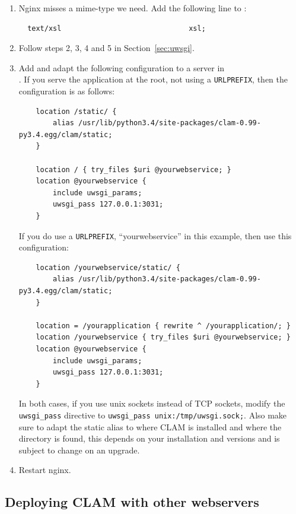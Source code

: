 \documentclass[a4paper,12pt,twoside,openright]{report}
\begin{document}
\begin{enumerate}[leftmargin=5mm]
\item Nginx misses a mime-type we need. Add the following
    line to :
{ \small
\begin{verbatim}
  text/xsl                              xsl;
\end{verbatim}
}

\item Follow steps 2, 3, 4 and 5 in Section~\ref{sec:uwsgi}.

\item Add and adapt the following configuration to a server in \\
    . If you serve the application at the
        root, not using a \texttt{URLPREFIX}, then the configuration is as
        follows:
{\small
\begin{verbatim}
    location /static/ {
        alias /usr/lib/python3.4/site-packages/clam-0.99-py3.4.egg/clam/static;
    }

    location / { try_files $uri @yourwebservice; }
    location @yourwebservice {
        include uwsgi_params;
        uwsgi_pass 127.0.0.1:3031;
    }
\end{verbatim}
}
If you do use a \texttt{URLPREFIX}, ``yourwebservice'' in this example, then
use this configuration:
{\small
\begin{verbatim}
    location /yourwebservice/static/ {
        alias /usr/lib/python3.4/site-packages/clam-0.99-py3.4.egg/clam/static;
    }

    location = /yourapplication { rewrite ^ /yourapplication/; }
    location /yourwebservice { try_files $uri @yourwebservice; }
    location @yourwebservice {
        include uwsgi_params;
        uwsgi_pass 127.0.0.1:3031;
    }
\end{verbatim}
}
In both cases, if you use unix sockets instead of TCP sockets, modify the \texttt{uwsgi\_pass} directive
to \texttt{uwsgi\_pass unix:/tmp/uwsgi.sock;}. Also make sure to adapt the static alias to where CLAM is
installed and where the  directory is found, this depends on your
installation and versions and is subject to change on an upgrade.
\item Restart nginx.
\end{enumerate}

\subsection{Deploying CLAM with other webservers}
\end{document}
